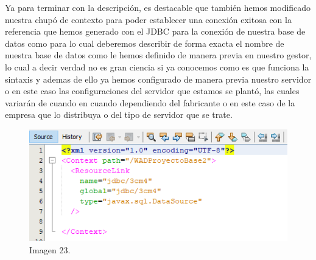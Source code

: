 \documentclass[10pt,a4paper]{article}
\begin{document}
Ya para terminar con la descripción, es destacable que también hemos modificado nuestra chupó de contexto para poder establecer una conexión exitosa con la referencia que hemos generado con el JDBC para la conexión de nuestra base de datos como para lo cual deberemos describir de forma exacta el nombre de nuestra base de datos como le hemos definido de manera previa en nuestro gestor, lo cual a decir verdad no es gran ciencia si ya conocemos como es que funciona la sintaxis y ademas de ello ya hemos configurado de manera previa nuestro servidor o en este caso las configuraciones del servidor que estamos se plantó, las cuales variarán de cuando en cuando dependiendo del fabricante o en este caso de la empresa que lo distribuya o del tipo de servidor que se trate.
\begin{figure}[h]
\centering
\includegraphics[width=13cm]{10_descripciondirectorio2}
\caption{Imagen  23.}
\label{fig:figure1}
\end{figure}

\pagebreak

\section{\color{colorIPN}{Resultados}}
\end{document}
